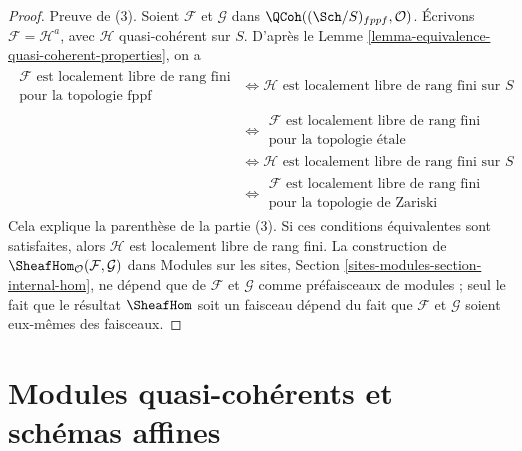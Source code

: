\begin{proof}
\medskip\noindent
Preuve de (3). Soient $\mathcal{F}$ et $\mathcal{G}$ dans
$\QCoh((\Sch/S)_{fppf}, \mathcal{O})$. Écrivons
$\mathcal{F} = \mathcal{H}^a$, avec $\mathcal{H}$ quasi-cohérent sur $S$.
D'après le Lemme \ref{lemma-equivalence-quasi-coherent-properties}, on a
\begin{align*}
\begin{gathered}
\mathcal{F}\text{ est localement libre de rang fini} \\
\text{pour la topologie fppf}
\end{gathered}
& \Leftrightarrow
\mathcal{H}\text{ est localement libre de rang fini sur }S \\
& \Leftrightarrow
\begin{gathered}
\mathcal{F}\text{ est localement libre de rang fini} \\
\text{pour la topologie \'etale}
\end{gathered} \\
& \Leftrightarrow
\mathcal{H}\text{ est localement libre de rang fini sur }S \\
& \Leftrightarrow
\begin{gathered}
\mathcal{F}\text{ est localement libre de rang fini} \\
\text{pour la topologie de Zariski}
\end{gathered}
\end{align*}
Cela explique la parenthèse de la partie (3). Si ces conditions équivalentes
sont satisfaites, alors $\mathcal{H}$ est localement libre de rang fini.
La construction de $\SheafHom_\mathcal{O}(\mathcal{F}, \mathcal{G})$ dans
Modules sur les sites, Section
\ref{sites-modules-section-internal-hom}, ne dépend que de $\mathcal{F}$ et
$\mathcal{G}$ comme préfaisceaux de modules ; seul le fait que le résultat
$\SheafHom$ soit un faisceau dépend du fait que $\mathcal{F}$ et
$\mathcal{G}$ soient eux-mêmes des faisceaux.
\end{proof}










\section{Modules quasi-cohérents et schémas affines}
\label{section-alternative-quasi-coherent}

